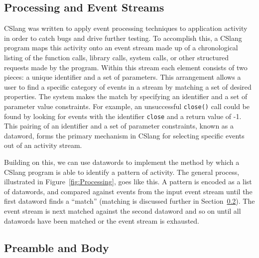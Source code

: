 \subsection{Processing and Event Streams}
\label{sub:ProcessingEventStreams}
CSlang was written to
apply event processing
techniques to application activity
in order to catch bugs and drive further
testing.
To accomplish this, a CSlang program maps this activity onto an
event stream
made up of a chronological listing of the function calls, library
calls, system calls, or other structured requests made by the program.
Within this stream each element consists of two pieces: a unique
identifier and a set of parameters.
This arrangement allows a user to find
a specific category of events
in a stream
by matching a set of desired properties.
The system makes the match by specifying
an identifier and a set of parameter value
constraints.  For example, an unsuccessful {\tt close()} call could be
found by looking for events with the identifier {\tt close} and a return
value of -1.  This pairing of an identifier and a set of parameter
constraints, known as a dataword, forms the primary mechanism in CSlang for
selecting specific events out of an activity stream.

Building on this, we can use datawords to implement the method by which
a CSlang program is able to
identify a  pattern of activity.
The general process, illustrated in Figure~\ref{fig:Processing}, goes like
this.  A pattern is encoded as a list of datawords, and compared against
events from the
input event stream until the first dataword
finds a ``match'' (matching is discussed further in
Section~\ref{sub:PreambleAndBody}).  The event stream is next matched
against the
second dataword
and so on until all datawords have been matched or the event stream is
exhausted.


%
%


\subsection{Preamble and Body}
\label{sub:PreambleAndBody}


